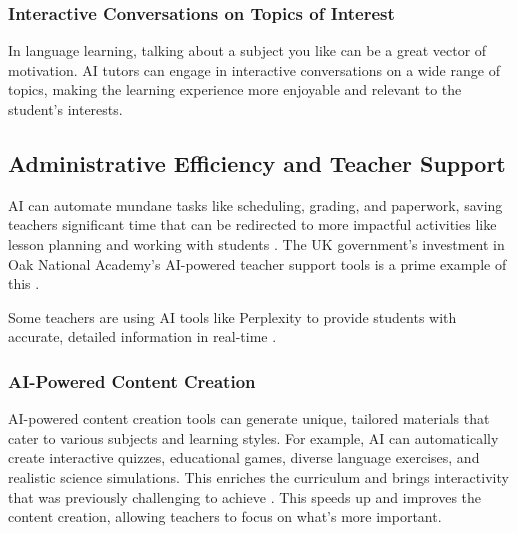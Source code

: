 \documentclass{article}
\begin{document}
\subsubsection{Interactive Conversations on Topics of Interest}

In language learning, talking about a subject you like can be a great vector of motivation. AI tutors can engage in interactive conversations on a wide range of topics, making the learning experience more enjoyable and relevant to the student's interests.

\subsection{Administrative Efficiency and Teacher Support}

AI can automate mundane tasks like scheduling, grading, and paperwork, saving teachers significant time that can be redirected to more impactful activities like lesson planning and working with students \cite{https://www.datasciencecentral.com/automated-grading-systems-how-ai-is-revolutionizing-exam-evaluation/} \cite{https://www.mckinsey.com/industries/education/our-insights/how-artificial-intelligence-will-impact-k-12-teachers}. The UK government's investment in Oak National Academy's AI-powered teacher support tools is a prime example of this \cite{https://www.gov.uk/government/news/new-support-for-teachers-powered-by-artificial-intelligence} \cite{https://www.openaccessgovernment.org/uk-government-invests-in-ai-powered-teacher-support/169271/}.

Some teachers are using AI tools like Perplexity to provide students with accurate, detailed information in real-time \cite{https://www.tri-cityherald.com/news/local/education/article280745295.html} \cite{https://www.tri-cityherald.com/news/local/education/article280745295.html}.


\subsubsection{AI-Powered Content Creation}

AI-powered content creation tools can generate unique, tailored materials that cater to various subjects and learning styles. For example, AI can automatically create interactive quizzes, educational games, diverse language exercises, and realistic science simulations. This enriches the curriculum and brings interactivity that was previously challenging to achieve \cite{https://neurosys.com/blog/generative-ai-in-learning-and-education}. This speeds up and improves the content creation, allowing teachers to focus on what's more important.
\end{document}
